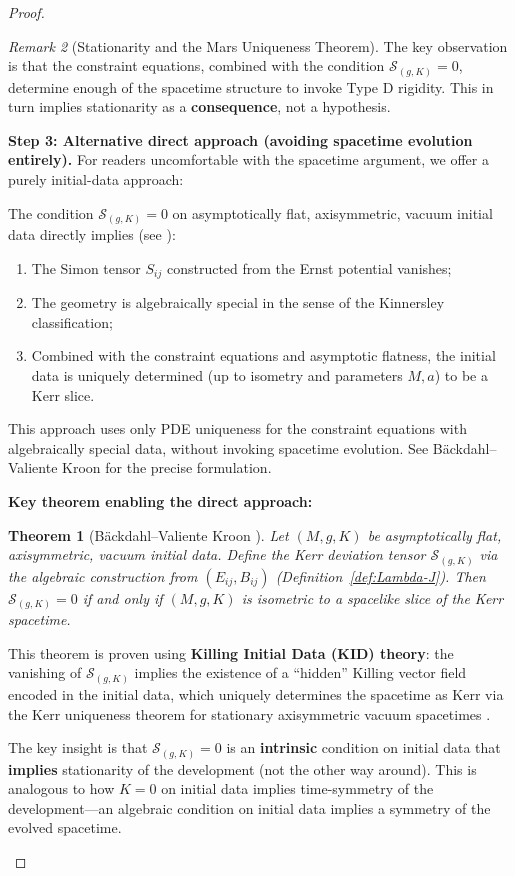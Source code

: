 \documentclass[12pt]{article}
\theoremstyle{plain}
\newtheorem{theorem}{Theorem}[section]
\theoremstyle{definition}
\theoremstyle{remark}
\newtheorem{remark}[theorem]{Remark}
\begin{document}
\begin{proof}
\begin{remark}[Stationarity and the Mars Uniqueness Theorem]
The key observation is that the constraint equations, combined with the condition $\mathcal{S}_{(g,K)} = 0$, determine enough of the spacetime structure to invoke Type D rigidity. This in turn implies stationarity as a \textbf{consequence}, not a hypothesis.

\textbf{Step 3: Alternative direct approach (avoiding spacetime evolution entirely).}
For readers uncomfortable with the spacetime argument, we offer a purely initial-data approach:

The condition $\mathcal{S}_{(g,K)} = 0$ on asymptotically flat, axisymmetric, vacuum initial data directly implies (see \cite{backdahl2010a, backdahl2016}):
\begin{enumerate}
    \item The Simon tensor $S_{ij}$ constructed from the Ernst potential vanishes;
    \item The geometry is algebraically special in the sense of the Kinnersley classification;
    \item Combined with the constraint equations and asymptotic flatness, the initial data is uniquely determined (up to isometry and parameters $M, a$) to be a Kerr slice.
\end{enumerate}
This approach uses only PDE uniqueness for the constraint equations with algebraically special data, without invoking spacetime evolution. See Bäckdahl--Valiente Kroon \cite{backdahl2010a} for the precise formulation.

\textbf{Key theorem enabling the direct approach:}
\begin{theorem}[Bäckdahl--Valiente Kroon \cite{backdahl2010a}]\label{thm:backdahl-vk}
Let $(M, g, K)$ be asymptotically flat, axisymmetric, vacuum initial data. Define the Kerr deviation tensor $\mathcal{S}_{(g,K)}$ via the algebraic construction from $(E_{ij}, B_{ij})$ (Definition~\ref{def:Lambda-J}). Then $\mathcal{S}_{(g,K)} = 0$ if and only if $(M, g, K)$ is isometric to a spacelike slice of the Kerr spacetime.
\end{theorem}
This theorem is proven using \textbf{Killing Initial Data (KID) theory}: the vanishing of $\mathcal{S}_{(g,K)}$ implies the existence of a ``hidden'' Killing vector field encoded in the initial data, which uniquely determines the spacetime as Kerr via the Kerr uniqueness theorem for stationary axisymmetric vacuum spacetimes \cite{carter1971, robinson1975}.

The key insight is that $\mathcal{S}_{(g,K)} = 0$ is an \textbf{intrinsic} condition on initial data that \textbf{implies} stationarity of the development (not the other way around). This is analogous to how $K = 0$ on initial data implies time-symmetry of the development---an algebraic condition on initial data implies a symmetry of the evolved spacetime.
\end{remark}


\end{proof}
\end{document}
